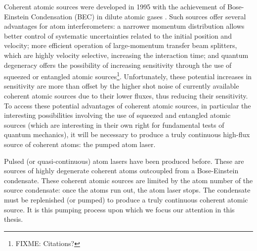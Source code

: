 Coherent atomic sources were developed in 1995 with the achievement of Bose-Einstein Condensation (BEC) in dilute atomic gases \citep{Anderson:1995vn,Bradley:1995ys,Davis:1995}.  Such sources offer several advantages for atom interferometers: a narrower momentum distribution allows better control of systematic uncertainties related to the initial position and velocity; more efficient operation of large-momentum transfer beam splitters, which are highly velocity selective, increasing the interaction time; and quantum degeneracy offers the possibility of increasing sensitivity through the use of squeezed or entangled atomic sources\footnote{FIXME: Citations?}.  Unfortunately, these potential increases in sensitivity are more than offset by the higher shot noise of currently available coherent atomic sources due to their lower fluxes, thus reducing their sensitivity.  To access these potential advantages of coherent atomic sources, in particular the interesting possibilities involving the use of squeezed and entangled atomic sources (which are interesting in their own right for fundamental tests of quantum mechanics), it will be necessary to produce a truly continuous high-flux source of coherent atoms: the pumped atom laser.  

Pulsed (or quasi-continuous) atom lasers have been produced before.  These are sources of highly degenerate coherent atoms outcoupled from a Bose-Einstein condensate.  These coherent atomic sources are limited by the atom number of the source condensate: once the atoms run out, the atom laser stops.  The condensate must be replenished (or pumped) to produce a truly continuous coherent atomic source.  It is this pumping process upon which we focus our attention in this thesis.





